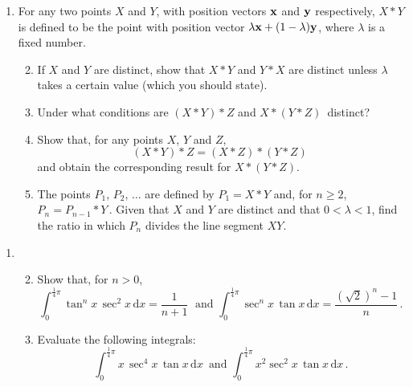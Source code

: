 \documentclass[a4, 11pt]{report}
\newlength{\qspace}
\newcounter{qnumber}
\newenvironment{question}%
 {\vspace{\qspace}
  \begin{enumerate}[\bfseries 1\quad][10]%
    \setcounter{enumi}{\value{qnumber}}%
    \item%
 }
{
  \end{enumerate}
  \filbreak
  \stepcounter{qnumber}
 }
\newenvironment{questionparts}[1][1]%
 {
  \begin{enumerate}[\bfseries (i)]%
    \setcounter{enumii}{#1}
    \addtocounter{enumii}{-1}
    \setlength{\itemsep}{5mm}
    \setlength{\parskip}{8pt}
 }
 {
  \end{enumerate}
 }
\def\d{{\mathrm d}}
\def\ge{\geqslant}
\begin{document}
\begin{question}
For any two points $X$ and $Y$, with position vectors
$\bf x$ and $\bf y$ respectively, $X*Y$ is defined
to be the point with position vector $\lambda {\bf x}+ (1-\lambda){\bf y}$,
where $\lambda$ is a fixed number. 



\begin{questionparts}
\item
If $X$ and $Y$ are distinct,
 show that 
$X*Y$ and  $Y*X$ are distinct
unless $\lambda$ takes a certain value (which you should
state). 

\item Under what conditions 
are $(X*Y)*Z$ and   $X*(Y*Z)\,$ distinct?

\item
Show that, for any points $X$, $Y$ and $Z$,
\[
(X*Y)*Z = (X*Z)*(Y*Z)\,
\]
and 
obtain  the corresponding result for $X*(Y*Z)$.

\item  The points $P_1$, $P_2$, $\ldots$
are defined by
$ 
P_1 = X*Y
$
and, for $n \ge2$,         $P_n= P_{n-1}*Y\,.$
Given that $X$ and $Y$ are distinct and that
$0<\lambda<1$, find the
 ratio in which  $P_n$ divides the line segment $XY$.

\end{questionparts}
\end{question}

\begin{question}
\begin{questionparts}
\item
Show that, for $n>  0$, 
\[
\int_0^{\frac14\pi} \tan^n x \,\sec^2 x \, \d x =
\frac 1 {n+1} \; 
\text{ \ \ \ and  \ \ \ }
 \int_0^{\frac14\pi} \!\! \sec ^n\! x \, \tan x \,
\d x = \frac{(\sqrt 2)^n - 1}n \,.
\] 

\item Evaluate the following integrals:
\[
\displaystyle 
\int_0^{\frac14\pi}
\!\! x\, \sec ^4 \! x\, \tan x \,  \d x \,
\text{ \ \ \ and \ \ \ }
\int_0^{\frac14\pi}
\!\! x^2 \sec ^2 \! x\, \tan x \,  \d x \,.
\]

\end{questionparts}
\end{question}
\end{document}
